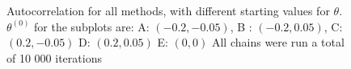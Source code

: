 \begin{figure}[ht]
      \caption{Autocorrelation for all methods, with different starting values for $\theta$.  $\theta^{\left(0\right)}$ for the subplots are:   A: $(-0.2, -0.05)$, B : $(-0.2, 0.05)$, C: $(0.2, -0.05)$ D: $(0.2, 0.05)$ E: $(0,0)$ All chains were run a total of 10 000 iterations}
    \label{fig:autocorrelation_50k_04_06_normal}%
\end{figure}


\

